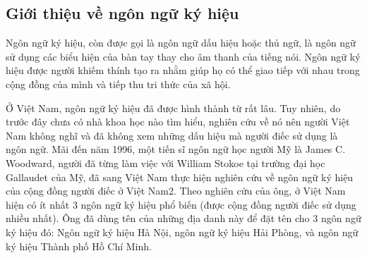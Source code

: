 \subsection{Giới thiệu về ngôn ngữ ký hiệu}
\indent Ngôn ngữ ký hiệu, còn được gọi là ngôn ngữ dấu hiệu hoặc thủ ngữ, là ngôn ngữ sử dụng các biểu hiện của bàn tay thay cho âm thanh của tiếng nói. Ngôn ngữ ký hiệu được người khiếm thính tạo ra nhằm giúp họ có thể giao tiếp với nhau trong cộng đồng của mình và tiếp thu tri thức của xã hội.

\indent Ở Việt Nam, ngôn ngữ ký hiệu đã được hình thành từ rất lâu. Tuy nhiên, do trước đây chưa có nhà khoa học nào tìm hiểu, nghiên cứu về nó nên người Việt Nam không nghĩ và đã không xem những dấu hiệu mà người điếc sử dụng là ngôn ngữ. Mãi đến năm 1996, một tiến sĩ ngôn ngữ học người Mỹ là James C. Woodward, người đã từng làm việc với William Stokoe tại trường đại học Gallaudet của Mỹ, đã sang Việt Nam thực hiện nghiên cứu về ngôn ngữ ký hiệu của cộng đồng người điếc ở Việt Nam2. Theo nghiên cứu của ông, ở Việt Nam hiện có ít nhất 3 ngôn ngữ ký hiệu phổ biến (được cộng đồng người điếc sử dụng nhiều nhất). Ông đã dùng tên của những địa danh này để đặt tên cho 3 ngôn ngữ ký hiệu đó: Ngôn ngữ ký hiệu Hà Nội, ngôn ngữ ký hiệu Hải Phòng, và ngôn ngữ ký hiệu Thành phố Hồ Chí Minh.

